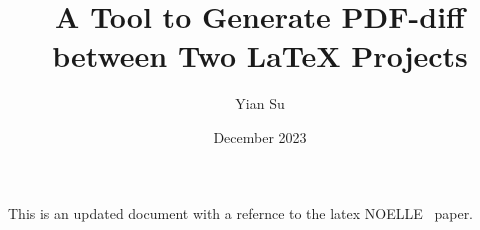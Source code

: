 \documentclass[12pt, letterpaper]{article}
\title{A Tool to Generate PDF-diff between Two \LaTeX{} Projects}
\author{Yian Su}
\date{December 2023}
\begin{document}
\maketitle

This is an updated document with a refernce to the latex NOELLE~\cite{noelle:cgo} paper.



\end{document}
